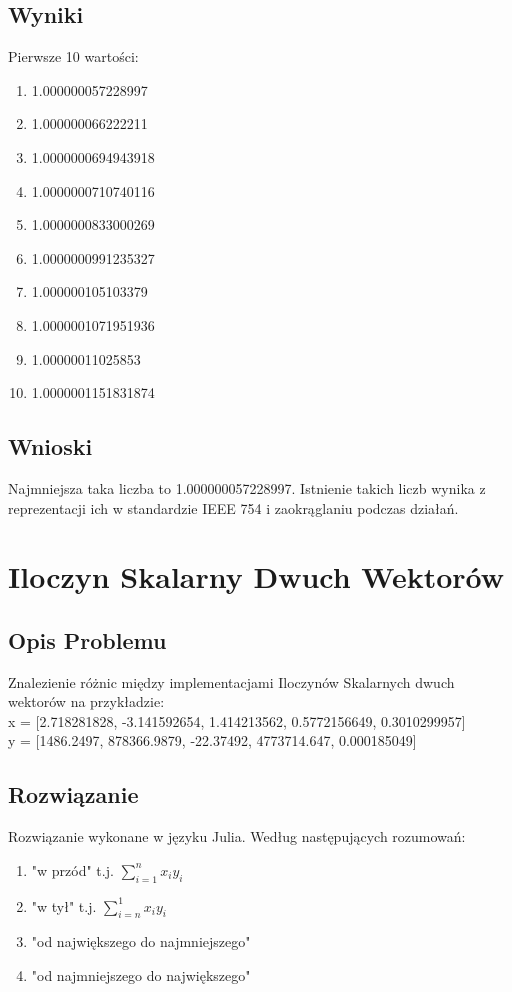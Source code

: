 \documentclass{article}
\begin{document}
\subsection{Wyniki}
Pierwsze 10 wartości:
\begin{multicols}{2}
\begin{enumerate}
    \item 1.000000057228997
    \item 1.000000066222211
    \item 1.0000000694943918
    \item 1.0000000710740116
    \item 1.0000000833000269
    \item 1.0000000991235327
    \item 1.000000105103379
    \item 1.0000001071951936
    \item 1.00000011025853
    \item 1.0000001151831874
\end{enumerate}
\end{multicols}
\subsection{Wnioski}
    Najmniejsza taka liczba to 1.000000057228997. Istnienie takich liczb wynika z reprezentacji ich w standardzie IEEE 754 i zaokrąglaniu podczas działań.

\section{Iloczyn Skalarny Dwuch Wektorów}
\subsection{Opis Problemu}
    Znalezienie różnic między implementacjami Iloczynów Skalarnych dwuch wektorów na przykładzie:\\ x = [2.718281828, -3.141592654, 1.414213562, 0.5772156649, 0.3010299957]\\
    y = [1486.2497, 878366.9879, -22.37492, 4773714.647, 0.000185049]
\subsection{Rozwiązanie}
    Rozwiązanie wykonane w języku Julia. Według następujących rozumowań:
    \begin{enumerate}
        \item "w przód" t.j. $\sum^n_{i=1} x_i y_i$
        \item "w tył" t.j. $\sum^1_{i=n} x_i y_i$
        \item "od największego do najmniejszego"
        \item "od najmniejszego do największego"
    \end{enumerate}
\end{document}

